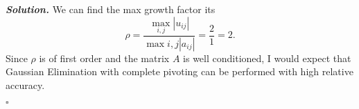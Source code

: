 \documentclass[12pt]{report}
\newenvironment{solution}[1][\it{Solution}]{\textbf{#1. } }{$\square$}
\begin{document}
\begin{solution}
    We can find the max growth factor its
    \[ \rho = \frac{\max_{i,j}|u_{ij}|}{\max{i,j}|a_{ij}|} = \frac{2}{1} = 2.\]
    Since $\rho$ is of first order and the matrix $A$ is well conditioned, I would expect that Gaussian Elimination with complete pivoting can be performed with high relative accuracy. 


\end{solution}

\newpage
\end{document}
